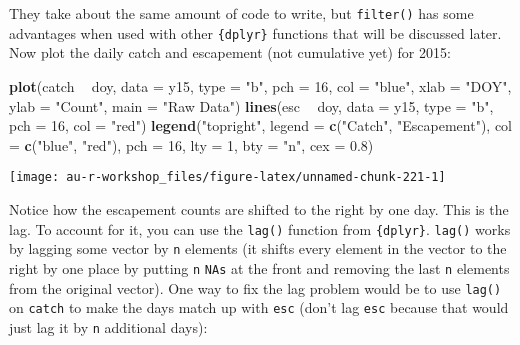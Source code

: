 \documentclass[]{book}
\newenvironment{Shaded}{\begin{snugshade}}{\end{snugshade}}
\newcommand{\KeywordTok}[1]{\textcolor[rgb]{0.13,0.29,0.53}{\textbf{#1}}}
\newcommand{\DataTypeTok}[1]{\textcolor[rgb]{0.13,0.29,0.53}{#1}}
\newcommand{\DecValTok}[1]{\textcolor[rgb]{0.00,0.00,0.81}{#1}}
\newcommand{\FloatTok}[1]{\textcolor[rgb]{0.00,0.00,0.81}{#1}}
\newcommand{\StringTok}[1]{\textcolor[rgb]{0.31,0.60,0.02}{#1}}
\newcommand{\OperatorTok}[1]{\textcolor[rgb]{0.81,0.36,0.00}{\textbf{#1}}}
\newcommand{\NormalTok}[1]{#1}
\theoremstyle{definition}
\theoremstyle{definition}
\theoremstyle{definition}
\theoremstyle{remark}
\begin{document}
They take about the same amount of code to write, but \texttt{filter()}
has some advantages when used with other \texttt{\{dplyr\}} functions
that will be discussed later. Now plot the daily catch and escapement
(not cumulative yet) for 2015:

\begin{Shaded}
\begin{Highlighting}[]
\KeywordTok{plot}\NormalTok{(catch }\OperatorTok{~}\StringTok{ }\NormalTok{doy, }\DataTypeTok{data =}\NormalTok{ y15, }\DataTypeTok{type =} \StringTok{"b"}\NormalTok{, }\DataTypeTok{pch =} \DecValTok{16}\NormalTok{, }\DataTypeTok{col =} \StringTok{"blue"}\NormalTok{,}
     \DataTypeTok{xlab =} \StringTok{"DOY"}\NormalTok{, }\DataTypeTok{ylab =} \StringTok{"Count"}\NormalTok{, }\DataTypeTok{main =} \StringTok{"Raw Data"}\NormalTok{)}
\KeywordTok{lines}\NormalTok{(esc }\OperatorTok{~}\StringTok{ }\NormalTok{doy, }\DataTypeTok{data =}\NormalTok{ y15, }\DataTypeTok{type =} \StringTok{"b"}\NormalTok{, }\DataTypeTok{pch =} \DecValTok{16}\NormalTok{, }\DataTypeTok{col =} \StringTok{"red"}\NormalTok{)}
\KeywordTok{legend}\NormalTok{(}\StringTok{"topright"}\NormalTok{, }\DataTypeTok{legend =} \KeywordTok{c}\NormalTok{(}\StringTok{"Catch"}\NormalTok{, }\StringTok{"Escapement"}\NormalTok{), }
       \DataTypeTok{col =} \KeywordTok{c}\NormalTok{(}\StringTok{"blue"}\NormalTok{, }\StringTok{"red"}\NormalTok{), }\DataTypeTok{pch =} \DecValTok{16}\NormalTok{, }\DataTypeTok{lty =} \DecValTok{1}\NormalTok{, }\DataTypeTok{bty =} \StringTok{"n"}\NormalTok{, }\DataTypeTok{cex =} \FloatTok{0.8}\NormalTok{)}
\end{Highlighting}
\end{Shaded}

\begin{center}\texttt{[image: au-r-workshop\_files/figure-latex/unnamed-chunk-221-1]} \end{center}

Notice how the escapement counts are shifted to the right by one day.
This is the lag. To account for it, you can use the \texttt{lag()}
function from \texttt{\{dplyr\}}. \texttt{lag()} works by lagging some
vector by \texttt{n} elements (it shifts every element in the vector to
the right by one place by putting \texttt{n} \texttt{NAs} at the front
and removing the last \texttt{n} elements from the original vector). One
way to fix the lag problem would be to use \texttt{lag()} on
\texttt{catch} to make the days match up with \texttt{esc} (don't lag
\texttt{esc} because that would just lag it by \texttt{n} additional
days):
\end{document}
